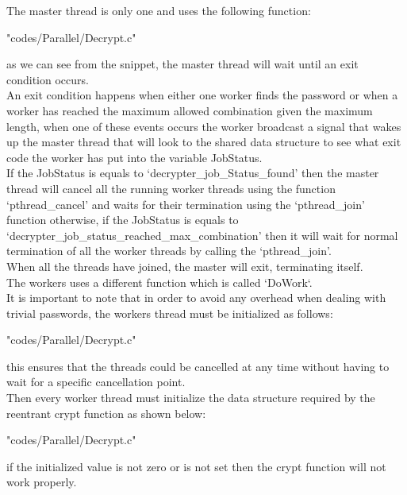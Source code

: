 \documentclass[10pt,twocolumn,letterpaper]{article}
\begin{document}
The master thread is only one and uses the following function:\\
\begin{lstinputlisting}[language=C,style=CSnippetStyle,caption=Master Thread,firstline=170,lastline=196]{"codes/Parallel/Decrypt.c"}
\end{lstinputlisting}
as we can see from the snippet, the master thread will wait until an exit condition occurs.\\
An exit condition happens when either one worker finds the password or when a worker has reached the maximum allowed combination given
the maximum length, when one of these events occurs the worker broadcast a signal that wakes up the master thread that will look to the
shared data structure to see what exit code the worker has put into the variable JobStatus.\\
If the JobStatus is equals to `decrypter\_job\_Status\_found' then the master thread will cancel all the running worker threads using 
the function `pthread\_cancel' and waits for their termination using the `pthread\_join' function otherwise, if the JobStatus is 
equals to `decrypter\_job\_status\_reached\_max\_combination' then it will wait for normal termination of all the worker threads by 
calling the `pthread\_join'.\\
When all the threads have joined, the master will exit, terminating itself.\\
The workers uses a different function which is called `DoWork`.\\
It is important to note that in order to avoid any overhead when dealing with trivial passwords, the workers thread must be initialized
as follows:\\
\begin{lstinputlisting}[language=C,style=CSnippetStyle,caption=Worker Thread Initialization,firstline=116,lastline=117]
		{"codes/Parallel/Decrypt.c"}
\end{lstinputlisting}
this ensures that the threads could be cancelled at any time without having to wait for a specific cancellation point.\\
Then every worker thread must initialize the data structure required by the reentrant crypt function as shown below:\\
\begin{lstinputlisting}[language=C,style=CSnippetStyle,caption=Crypt Function Initialization,firstline=110,lastline=112]
		{"codes/Parallel/Decrypt.c"}
\end{lstinputlisting}
if the initialized value is not zero or is not set then the crypt function will not work properly.\\
\end{document}
